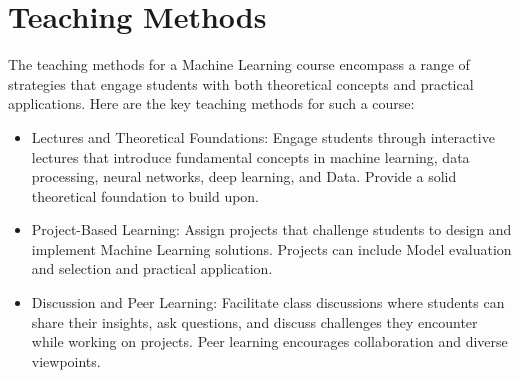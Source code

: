 \section{Teaching Methods}
The teaching methods for a Machine Learning course encompass a range of strategies that engage students with both theoretical concepts and practical applications. Here are the key teaching methods for such a course:
\begin{itemize}
    \item Lectures and Theoretical Foundations: Engage students through interactive lectures that introduce fundamental concepts in machine learning, data processing, neural networks, deep learning, and Data. Provide a solid theoretical foundation to build upon.

    \item Project-Based Learning: Assign projects that challenge students to design and implement Machine Learning solutions. Projects can include Model evaluation and selection and practical application.

    \item Discussion and Peer Learning: Facilitate class discussions where students can share their insights, ask questions, and discuss challenges they encounter while working on projects. Peer learning encourages collaboration and diverse viewpoints.


\end{itemize}
